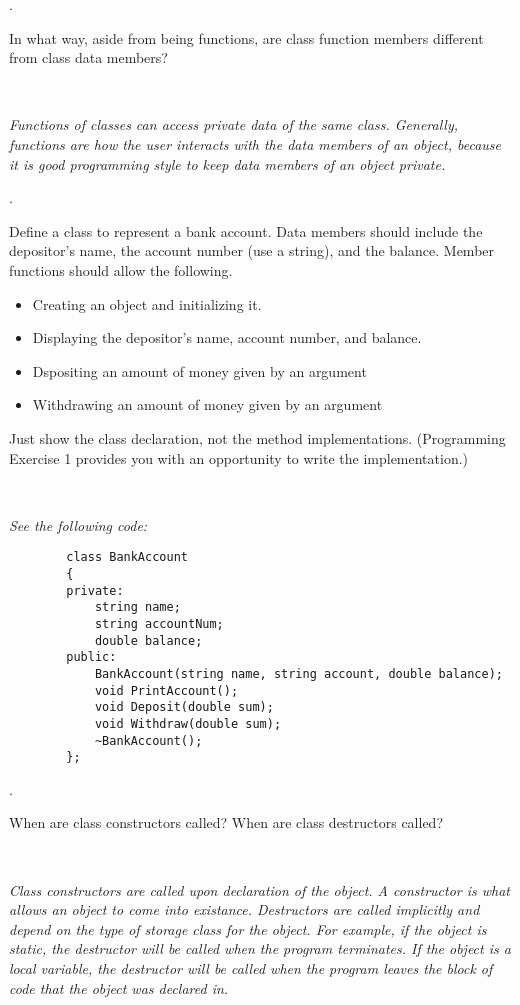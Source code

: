 \documentclass{amsart}
\begin{document}
. 
\begin{minipage}[t]{11.5 cm}
	In what way, aside from being functions, are class function members different from class data members?
\end{minipage} \\[1ex]
\phantom{2. } 
\begin{minipage}[t]{11.5 cm}
	{\slshape 
	Functions of classes can access private data of the same class.
	Generally, functions are how the user interacts with the 
	data members of an object, because it is good programming
	style to keep data members of an object private.
	} 
\end{minipage} 
\vfill
\vfill
\newpage

\phantom{\quad} \vfill
{}. 
\begin{minipage}[t]{11.5 cm}
	Define a class to represent a bank account. Data members should include the depositor's name, the account number (use a string), and the balance. Member functions should allow the following.
	\begin{itemize}
		\item Creating an object and initializing it.
		\item Displaying the depositor's name, account number, and balance.
		\item Dspositing an amount of money given by an argument
		\item Withdrawing an amount of money given by an argument
	\end{itemize}
	Just show the class declaration, not the method implementations. (Programming Exercise 1 provides you with an opportunity to write the implementation.)
\end{minipage} \\[1ex]
\phantom{3. } 
\begin{minipage}[t]{11.5 cm}
	{\slshape 
	See the following code:
	}
	\begin{verbatim}
		class BankAccount
		{
		private:
		    string name;
		    string accountNum;
		    double balance;
		public:
		    BankAccount(string name, string account, double balance);
		    void PrintAccount();
		    void Deposit(double sum);
		    void Withdraw(double sum);
		    ~BankAccount();
		};
	\end{verbatim}
\end{minipage} 
\vfill

. 
\begin{minipage}[t]{11.5 cm}
	When are class constructors called? When are class destructors called?
\end{minipage} \\[1ex]
\phantom{3. } 
\begin{minipage}[t]{11.5 cm}
	{\slshape 
	Class constructors are called upon declaration of the object.
	A constructor is what allows an object to come into existance.
	Destructors are called implicitly and depend on the type of 
	storage class for the object. 
	For example, if the object is static, the destructor will
	be called when the program terminates. 
	If the object is a local variable, the destructor will be called
	when the program leaves the block of code that the 
	object was declared in.
	}
\end{minipage} 
\vfill
\end{document}
